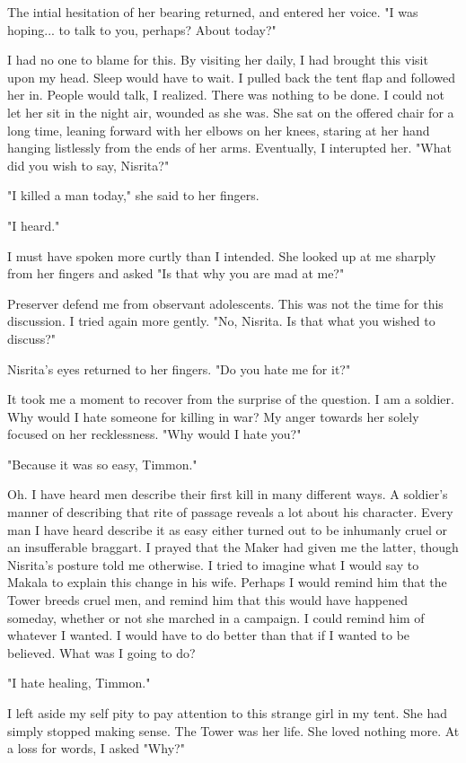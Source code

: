 \documentclass{article}
\begin{document}
The intial hesitation of her bearing returned, and entered her voice. "I was hoping... to talk to you, perhaps? About today?"

I had no one to blame for this. By visiting her daily, I had brought this visit upon my head. Sleep would have to wait. I pulled back the tent flap and followed her in. People would talk, I realized. There was nothing to be done. I could not let her sit in the night air, wounded as she was. She sat on the offered chair for a long time, leaning forward with her elbows on her knees, staring at her hand hanging listlessly from the ends of her arms. Eventually, I interupted her. "What did you wish to say, Nisrita?"

"I killed a man today," she said to her fingers.

"I heard."

I must have spoken more curtly than I intended. She looked up at me sharply from her fingers and asked "Is that why you are mad at me?"

Preserver defend me from observant adolescents. This was not the time for this discussion. I tried again more gently. "No, Nisrita. Is that what you wished to discuss?"

Nisrita's eyes returned to her fingers. "Do you hate me for it?"

It took me a moment to recover from the surprise of the question. I am a soldier. Why would I hate someone for killing in war? My anger towards her solely focused on her recklessness. "Why would I hate you?"

"Because it was so easy, Timmon."

Oh. I have heard men describe their first kill in many different ways. A soldier's manner of describing that rite of passage reveals a lot about his character. Every man I have heard describe it as easy either turned out to be inhumanly cruel or an insufferable braggart. I prayed that the Maker had given me the latter, though Nisrita's posture told me otherwise. I tried to imagine what I would say to Makala to explain this change in his wife. Perhaps I would remind him that the Tower breeds cruel men, and remind him that this would have happened someday, whether or not she marched in a campaign. I could remind him of whatever I wanted. I would have to do better than that if I wanted to be believed. What was I going to do?

"I hate healing, Timmon."

I left aside my self pity to pay attention to this strange girl in my tent. She had simply stopped making sense. The Tower was her life. She loved nothing more. At a loss for words, I asked "Why?"
\end{document}
